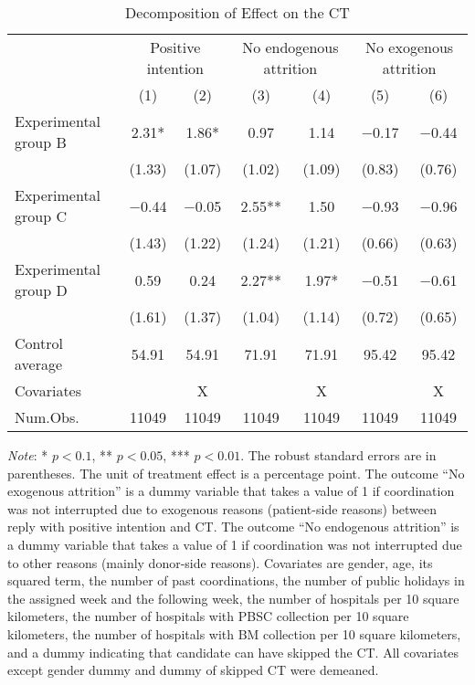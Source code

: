 \documentclass[12pt, a4paper]{article}
\begin{document}
\begin{table}[H]

\caption{\label{tab:lm-test-decompose}Decomposition of Effect on the CT}
\centering
\fontsize{8}{10}\selectfont
\begin{threeparttable}
\begin{tabular}[t]{>{\raggedright\arraybackslash}p{20em}cccccc}
\toprule
\multicolumn{1}{c}{ } & \multicolumn{2}{c}{Positive intention} & \multicolumn{2}{c}{No endogenous attrition} & \multicolumn{2}{c}{No exogenous attrition} \\
\cmidrule(l{3pt}r{3pt}){2-3} \cmidrule(l{3pt}r{3pt}){4-5} \cmidrule(l{3pt}r{3pt}){6-7}
  & (1) & (2) & (3) & (4) & (5) & (6)\\
\midrule
Experimental group B & \num{2.31}* & \num{1.86}* & \num{0.97} & \num{1.14} & \num{-0.17} & \num{-0.44}\\
 & (\num{1.33}) & (\num{1.07}) & (\num{1.02}) & (\num{1.09}) & (\num{0.83}) & (\num{0.76})\\
Experimental group C & \num{-0.44} & \num{-0.05} & \num{2.55}** & \num{1.50} & \num{-0.93} & \num{-0.96}\\
 & (\num{1.43}) & (\num{1.22}) & (\num{1.24}) & (\num{1.21}) & (\num{0.66}) & (\num{0.63})\\
Experimental group D & \num{0.59} & \num{0.24} & \num{2.27}** & \num{1.97}* & \num{-0.51} & \num{-0.61}\\
 & (\num{1.61}) & (\num{1.37}) & (\num{1.04}) & (\num{1.14}) & (\num{0.72}) & (\num{0.65})\\
\midrule
Control average & 54.91 & 54.91 & 71.91 & 71.91 & 95.42 & 95.42\\
Covariates &  & X &  & X &  & X\\
Num.Obs. & \num{11049} & \num{11049} & \num{11049} & \num{11049} & \num{11049} & \num{11049}\\
\bottomrule
\end{tabular}
\begin{tablenotes}
\item \emph{Note}: * $p < 0.1$, ** $p < 0.05$, *** $p < 0.01$. The robust standard errors are in parentheses. The unit of treatment effect is a percentage point. The outcome ``No exogenous attrition'' is a dummy variable that takes a value of 1 if coordination was not interrupted due to exogenous reasons (patient-side reasons) between reply with positive intention and CT. The outcome ``No endogenous attrition'' is a dummy variable that takes a value of 1 if coordination was not interrupted due to other reasons (mainly donor-side reasons). Covariates are gender, age, its squared term, the number of past coordinations, the number of public holidays in the assigned week and the following week, the number of hospitals per 10 square kilometers, the number of hospitals with PBSC collection per 10 square kilometers, the number of hospitals with BM collection per 10 square kilometers, and a dummy indicating that candidate can have skipped the CT. All covariates except gender dummy and dummy of skipped CT were demeaned.
\end{tablenotes}
\end{threeparttable}
\end{table}
\end{document}
